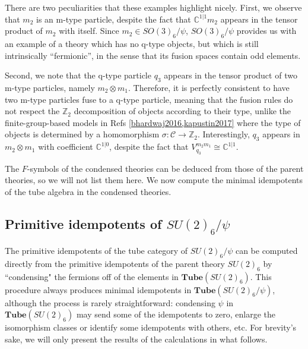 \documentclass[12pt,a4paper]{article}
\newcounter{arrow}
\newcommand{\tp}{\otimes}
\newcommand{\ra}{\rightarrow}
\newcommand{\mcc}{\mathcal{C}}
\newcommand{\zt}{\mathbb{Z}_2}
\newcommand{\tube}{\textbf{Tube}}
\newcommand{\kw}[1]{{\color{kwcolor}\footnotesize{(KW) #1}}}
\newcommand{\dave}[1]{{\color{ao(english)}\footnotesize{(DA) #1}}}
\newcommand{\ethan}[1]{{\color{amethyst}\footnotesize{(EL) #1}}}
\begin{document}
There are two peculiarities that these examples highlight nicely. 
First, we observe that $m_2$ is an m-type particle, despite the fact that $\mathbb{C}^{1|1}m_2$ 
appears in the tensor product of $m_2$ with itself.
Since $m_2\in SO(3)_6/\psi$, $SO(3)_6/\psi$ provides us with an example of a theory which has 
no q-type objects, but which is still intrinsically ``fermionic'', in the sense that its fusion spaces contain odd elements. 

Second, we note that the q-type particle $q_3$ appears in the tensor product of two m-type 
particles, namely $m_2 \tp m_1$. 
Therefore, it is perfectly consistent to have two m-type particles fuse to a q-type particle, meaning 
that the fusion rules do not respect the $\zt$ 
decomposition of objects according to their type, 
unlike the finite-group-based models in Refs \ref{bhardwaj2016,kapustin2017} where the type of objects is determined 
by a homomorphism $\sigma : \mcc \ra \zt$. 
Interestingly, $q_3$ appears in $m_2 \tp m_1$ with coefficient $\mathbb{C}^{1|0}$, despite the fact that $V^{m_2 m_1}_{q_3} \cong \mathbb{C}^{1|1}$.

The $F$-symbols of the condensed theories can be deduced from those of the parent theories, so we will not list them here.
We now compute the minimal idempotents of the tube algebra in the condensed theories.




\subsection{Primitive idempotents of $SU(2)_6/\psi$}

The primitive idempotents of the tube category of $SU(2)_6/\psi$ can be computed directly 
from the primitive idempotents of the parent theory $SU(2)_6$ by ``condensing" the fermions off of the elements in $\tube(SU(2)_6)$. 
This procedure always produces minimal idempotents in $\tube(SU(2)_6/\psi)$, 
although the process is rarely straightforward: condensing $\psi$ in $\tube(SU(2)_6)$ 
may send some of the idempotents to zero, enlarge the isomorphism classes or identify some idempotents with others, etc.
For brevity's sake, we will only present the results of the calculations in what follows. 
\end{document}
